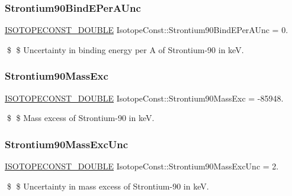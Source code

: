 \subsubsection{\texorpdfstring{Strontium90\+Bind\+E\+Per\+A\+Unc}{Strontium90BindEPerAUnc}}
{\footnotesize\ttfamily \mbox{\hyperlink{group___isotope_const-_macros_ga8f45a7272ce02c0b4c65c44636ed719a}{I\+S\+O\+T\+O\+P\+E\+C\+O\+N\+S\+T\+\_\+\+D\+O\+U\+B\+LE}} Isotope\+Const\+::\+Strontium90\+Bind\+E\+Per\+A\+Unc = 0.}

\$ \$ Uncertainty in binding energy per A of Strontium-\/90 in keV. \mbox{\label{group___isotope_const-_strontium-_sr90_ga1e9eccfdc3cc451a5e29e8f25eb2ae1d}} 
\subsubsection{\texorpdfstring{Strontium90\+Mass\+Exc}{Strontium90MassExc}}
{\footnotesize\ttfamily \mbox{\hyperlink{group___isotope_const-_macros_ga8f45a7272ce02c0b4c65c44636ed719a}{I\+S\+O\+T\+O\+P\+E\+C\+O\+N\+S\+T\+\_\+\+D\+O\+U\+B\+LE}} Isotope\+Const\+::\+Strontium90\+Mass\+Exc = -\/85948.}

\$ \$ Mass excess of Strontium-\/90 in keV. \mbox{\label{group___isotope_const-_strontium-_sr90_ga18d982aa835d82162f9f8a781954d70b}} 
\subsubsection{\texorpdfstring{Strontium90\+Mass\+Exc\+Unc}{Strontium90MassExcUnc}}
{\footnotesize\ttfamily \mbox{\hyperlink{group___isotope_const-_macros_ga8f45a7272ce02c0b4c65c44636ed719a}{I\+S\+O\+T\+O\+P\+E\+C\+O\+N\+S\+T\+\_\+\+D\+O\+U\+B\+LE}} Isotope\+Const\+::\+Strontium90\+Mass\+Exc\+Unc = 2.}

\$ \$ Uncertainty in mass excess of Strontium-\/90 in keV. \mbox{\label{group___isotope_const-_strontium-_sr90_gaadf30a5f8ba02b372c2c425311b6d295}} 
